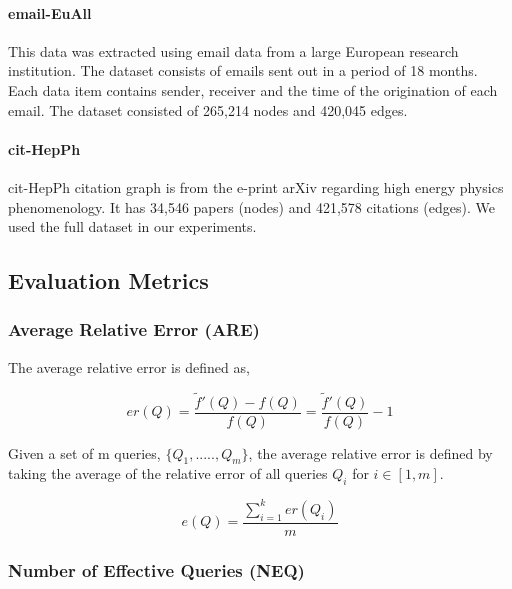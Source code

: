 \paragraph{email-EuAll\cite{leskovec_graph_2007}}
This data was extracted using email data from a large European research institution. The dataset consists of emails sent out in a period of 18 months. Each data item contains sender, receiver and the time of the origination of each email. The dataset consisted of 265,214 nodes and 420,045 edges\cite{noauthor_snap_nodate_email}. 

\paragraph{cit-HepPh\cite{leskovec_graphs_2005, gehrke_overview_2003}}
cit-HepPh citation graph is from the e-print arXiv regarding high energy physics phenomenology. It has 34,546 papers (nodes) and 421,578 citations (edges). We used the full dataset in our experiments. 

\subsection{Evaluation Metrics}
\label{section:design_evaluation_metrics}

\subsubsection{Average Relative Error (ARE)}
\label{section:metrics_are}

The average relative error is defined as,

\begin{equation}
    er(Q) =  \frac{\tilde{f}'(Q) - f(Q)}{f(Q)} = \frac{\tilde{f}'(Q)}{f(Q)} -1
\end{equation}

Given a set of m queries, $\{ Q_1 , ....., Q_m \}$, the average relative error is defined by taking the average of the relative error of all queries $Q_i$ for \(i \in [1,m]\).

\begin{equation}
    e(Q) =  \frac{\sum_{i=1}^{k} er(Q_i)}{m}
\end{equation}

\subsubsection{Number of Effective Queries (NEQ)}
\label{section:metrics_neq}

